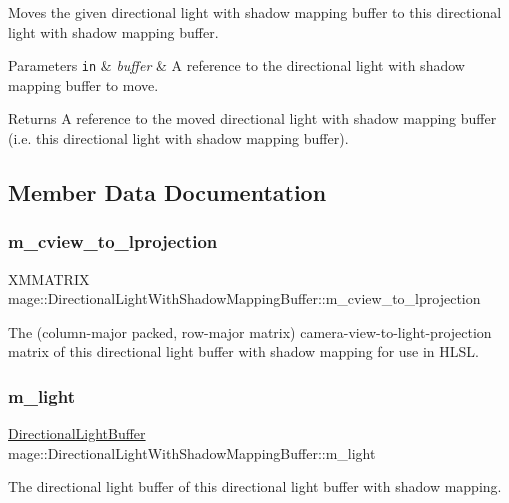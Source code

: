 Moves the given directional light with shadow mapping buffer to this directional light with shadow mapping buffer.


\begin{DoxyParams}[1]{Parameters}
\mbox{\tt in}  & {\em buffer} & A reference to the directional light with shadow mapping buffer to move. \\
\hline
\end{DoxyParams}
\begin{DoxyReturn}{Returns}
A reference to the moved directional light with shadow mapping buffer (i.\+e. this directional light with shadow mapping buffer). 
\end{DoxyReturn}


\subsection{Member Data Documentation}
\hypertarget{structmage_1_1_directional_light_with_shadow_mapping_buffer_a73101e32d19de54846c3075b45ab5566}{}\label{structmage_1_1_directional_light_with_shadow_mapping_buffer_a73101e32d19de54846c3075b45ab5566} 
\subsubsection{\texorpdfstring{m\+\_\+cview\+\_\+to\+\_\+lprojection}{m\_cview\_to\_lprojection}}
{\footnotesize\ttfamily X\+M\+M\+A\+T\+R\+IX mage\+::\+Directional\+Light\+With\+Shadow\+Mapping\+Buffer\+::m\+\_\+cview\+\_\+to\+\_\+lprojection}

The (column-\/major packed, row-\/major matrix) camera-\/view-\/to-\/light-\/projection matrix of this directional light buffer with shadow mapping for use in H\+L\+SL. \hypertarget{structmage_1_1_directional_light_with_shadow_mapping_buffer_a911c958b0e442c927f6e8f8f73d9dbe1}{}\label{structmage_1_1_directional_light_with_shadow_mapping_buffer_a911c958b0e442c927f6e8f8f73d9dbe1} 
\subsubsection{\texorpdfstring{m\+\_\+light}{m\_light}}
{\footnotesize\ttfamily \hyperlink{structmage_1_1_directional_light_buffer}{Directional\+Light\+Buffer} mage\+::\+Directional\+Light\+With\+Shadow\+Mapping\+Buffer\+::m\+\_\+light}

The directional light buffer of this directional light buffer with shadow mapping. 